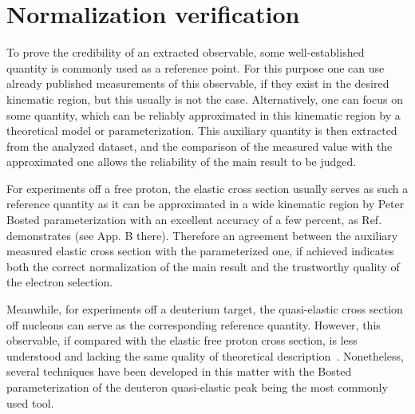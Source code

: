 \chapter{Normalization verification}
\label{Sect:norm}

To prove the credibility of an extracted observable, some well-established quantity is commonly used as a reference point. For this purpose one can use already published measurements of this observable, if they exist in the desired kinematic region, but this usually is not the case. Alternatively, one can focus on some quantity, which can be reliably approximated in this kinematic region by a theoretical model or parameterization. 
This auxiliary quantity is then extracted from the analyzed dataset, and the comparison of the measured value with the approximated one allows the reliability of the main result to be judged.

For experiments off a free proton, the elastic cross section usually serves as such a reference quantity as it can be approximated in a wide kinematic region by Peter Bosted parameterization with an excellent accuracy of a few percent, as Ref.~\cite{note_QE_peak}  demonstrates (see App. B there). Therefore an agreement between the auxiliary measured elastic cross section with the parameterized one, if achieved indicates both the correct normalization of the main result and the trustworthy quality of the electron selection.


Meanwhile, for experiments off a deuterium target, the quasi-elastic cross section off nucleons can serve as the corresponding reference quantity. 
However, this observable, if compared with the elastic free proton cross section, is less understood and lacking the same quality of theoretical description~\cite{note_QE_peak}. Nonetheless, several techniques have been developed in this matter with the Bosted parameterization of the deuteron quasi-elastic peak being the most commonly used tool.






